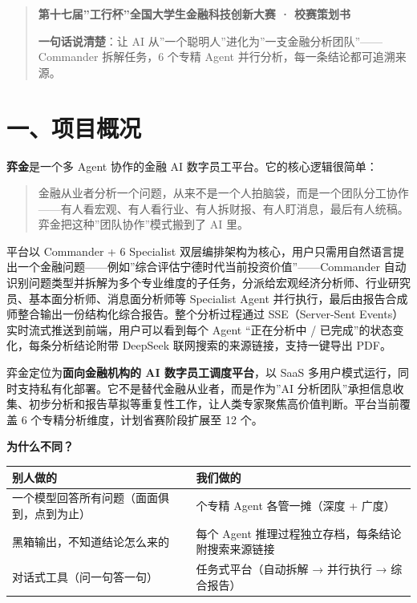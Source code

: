 \documentclass[
]{ctexart}
\author{}
\date{}
\begin{document}
\begin{quote}
\textbf{第十七届''工行杯''全国大学生金融科技创新大赛 · 校赛策划书}

\textbf{一句话说清楚}：让 AI
从''一个聪明人''进化为''一支金融分析团队''------Commander 拆解任务，6
个专精 Agent 并行分析，每一条结论都可追溯来源。
\end{quote}

\section{一、项目概况}\label{ux4e00ux9879ux76eeux6982ux51b5}

\textbf{弈金}是一个多 Agent 协作的金融 AI
数字员工平台。它的核心逻辑很简单：

\begin{quote}
金融从业者分析一个问题，从来不是一个人拍脑袋，而是一个团队分工协作------有人看宏观、有人看行业、有人拆财报、有人盯消息，最后有人统稿。弈金把这种''团队协作''模式搬到了
AI 里。
\end{quote}

平台以 Commander + 6 Specialist
双层编排架构为核心，用户只需用自然语言提出一个金融问题------例如''综合评估宁德时代当前投资价值''------Commander
自动识别问题类型并拆解为多个专业维度的子任务，分派给宏观经济分析师、行业研究员、基本面分析师、消息面分析师等
Specialist Agent
并行执行，最后由报告合成师整合输出一份结构化综合报告。整个分析过程通过
SSE（Server-Sent Events）实时流式推送到前端，用户可以看到每个 Agent
``正在分析中 / 已完成''的状态变化，每条分析结论附带 DeepSeek
联网搜索的来源链接，支持一键导出 PDF。

弈金定位为\textbf{面向金融机构的 AI 数字员工调度平台}，以 SaaS
多用户模式运行，同时支持私有化部署。它不是替代金融从业者，而是作为''AI
分析团队''承担信息收集、初步分析和报告草拟等重复性工作，让人类专家聚焦高价值判断。平台当前覆盖
6 个专精分析维度，计划省赛阶段扩展至 12 个。

\textbf{为什么不同？}

\begin{longtable}[]{@{}
  >{\raggedright\arraybackslash}p{}
  >{\raggedright\arraybackslash}p{}@{}}
\toprule\noalign{}
\begin{minipage}[b]{\linewidth}\raggedright
别人做的
\end{minipage} & \begin{minipage}[b]{\linewidth}\raggedright
我们做的
\end{minipage} \\
\midrule\noalign{}
\endhead
\bottomrule\noalign{}
\endlastfoot
一个模型回答所有问题（面面俱到，点到为止） & 6 个专精 Agent
各管一摊（深度 + 广度） \\
黑箱输出，不知道结论怎么来的 & 每个 Agent
推理过程独立存档，每条结论附搜索来源链接 \\
对话式工具（问一句答一句） & 任务式平台（自动拆解 → 并行执行 →
综合报告） \\
\end{longtable}
\end{document}
